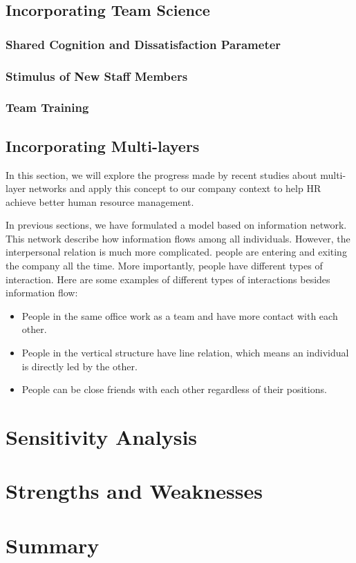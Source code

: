 \documentclass[tcn = 37075, sheet = true, abstract = true]{mcmthesis}
\begin{document}
\subsection{Incorporating Team Science}

\subsubsection{Shared Cognition and Dissatisfaction Parameter}

\subsubsection{Stimulus of New Staff Members}

\subsubsection{Team Training}

\subsection{Incorporating Multi-layers}

In this section, we will explore the progress made by recent studies about multi-layer networks and apply this concept to our company context to help HR achieve better human resource management.

In previous sections, we have formulated a model based on information network. This network describe how information flows among all individuals. However, the interpersonal relation is much more complicated. people are entering and exiting the company all the time. More importantly, people have different types of interaction. Here are some examples of different types of interactions besides information flow:

\begin{itemize}
\item People in the same office work as a team and have more contact with each other. 
\item People in the vertical structure have line relation, which means an individual is directly led by the other.
\item People can be close friends with each other regardless of their positions.
\end{itemize}



\section{Sensitivity Analysis}


\section{Strengths and Weaknesses}

\section{Summary}


\end{document}
